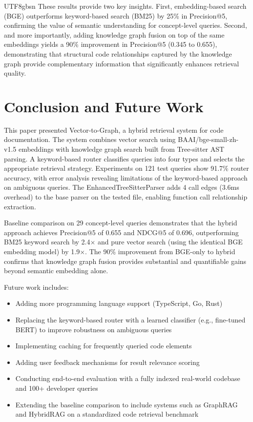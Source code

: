 \documentclass[11pt]{article}
\begin{document}
\begin{CJK*}{UTF8}{gbsn}
These results provide two key insights. First, embedding-based search (BGE) outperforms keyword-based search (BM25) by 25\% in Precision@5, confirming the value of semantic understanding for concept-level queries. Second, and more importantly, adding knowledge graph fusion on top of the same embeddings yields a 90\% improvement in Precision@5 (0.345 to 0.655), demonstrating that structural code relationships captured by the knowledge graph provide complementary information that significantly enhances retrieval quality.

\section{Conclusion and Future Work}

This paper presented Vector-to-Graph, a hybrid retrieval system for code documentation. The system combines vector search using BAAI/bge-small-zh-v1.5 embeddings with knowledge graph search built from Tree-sitter AST parsing. A keyword-based router classifies queries into four types and selects the appropriate retrieval strategy. Experiments on 121 test queries show 91.7\% router accuracy, with error analysis revealing limitations of the keyword-based approach on ambiguous queries. The EnhancedTreeSitterParser adds 4 call edges (3.6ms overhead) to the base parser on the tested file, enabling function call relationship extraction.

Baseline comparison on 29 concept-level queries demonstrates that the hybrid approach achieves Precision@5 of 0.655 and NDCG@5 of 0.696, outperforming BM25 keyword search by 2.4$\times$ and pure vector search (using the identical BGE embedding model) by 1.9$\times$. The 90\% improvement from BGE-only to hybrid confirms that knowledge graph fusion provides substantial and quantifiable gains beyond semantic embedding alone.

Future work includes:
\begin{itemize}
    \item Adding more programming language support (TypeScript, Go, Rust)
    \item Replacing the keyword-based router with a learned classifier (e.g., fine-tuned BERT) to improve robustness on ambiguous queries
    \item Implementing caching for frequently queried code elements
    \item Adding user feedback mechanisms for result relevance scoring
    \item Conducting end-to-end evaluation with a fully indexed real-world codebase and 100+ developer queries
    \item Extending the baseline comparison to include systems such as GraphRAG and HybridRAG on a standardized code retrieval benchmark
\end{itemize}


\end{CJK*}
\end{document}
